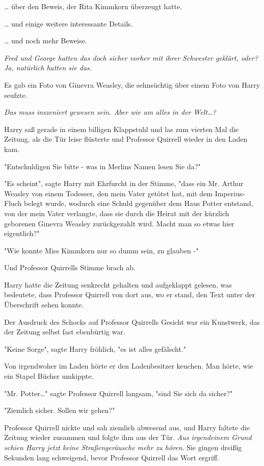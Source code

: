 {… über den Beweis, der Rita Kimmkorn überzeugt hatte.

… und einige weitere interessante Details.

… und noch mehr Beweise.

\emph{Fred und George hatten das doch sicher vorher mit ihrer Schwester geklärt, oder? Ja, natürlich hatten sie das.}

Es gab ein Foto von Ginevra Weasley, die sehnsüchtig über einem Foto von Harry seufzte.

\emph{Das muss inszeniert gewesen sein. Aber wie um alles in der Welt…?}

Harry saß gerade in einem billigen Klappstuhl und las zum vierten Mal die Zeitung, als die Tür leise flüsterte und Professor Quirrell wieder in den Laden kam.

"Entschuldigen Sie bitte - was in Merlins Namen lesen Sie da?"

"Es scheint", sagte Harry mit Ehrfurcht in der Stimme, "dass ein Mr. Arthur Weasley von einem Todesser, den mein Vater getötet hat, mit dem Imperius-Fluch belegt wurde, wodurch eine Schuld gegenüber dem Haus Potter entstand, von der mein Vater verlangte, dass sie durch die Heirat mit der kürzlich geborenen Ginevra Weasley zurückgezahlt wird. Macht man so etwas hier eigentlich?"

"Wie konnte Miss Kimmkorn nur so dumm sein, zu glauben -"

Und Professor Quirrells Stimme brach ab.

Harry hatte die Zeitung senkrecht gehalten und aufgeklappt gelesen, was bedeutete, dass Professor Quirrell von dort aus, wo er stand, den Text unter der Überschrift sehen konnte.

Der Ausdruck des Schocks auf Professor Quirrells Gesicht war ein Kunstwerk, das der Zeitung selbst fast ebenbürtig war.

"Keine Sorge", sagte Harry fröhlich, "es ist alles gefälscht."

Von irgendwoher im Laden hörte er den Ladenbesitzer keuchen. Man hörte, wie ein Stapel Bücher umkippte.

"Mr. Potter…" sagte Professor Quirrell langsam, "sind Sie sich da sicher?"

"Ziemlich sicher. Sollen wir gehen?"

Professor Quirrell nickte und sah ziemlich abwesend aus, und Harry faltete die Zeitung wieder zusammen und folgte ihm aus der Tür. \emph{Aus irgendeinem Grund schien Harry jetzt keine Straßengeräusche mehr zu hören}. Sie gingen dreißig Sekunden lang schweigend, bevor Professor Quirrell das Wort ergriff.

}
